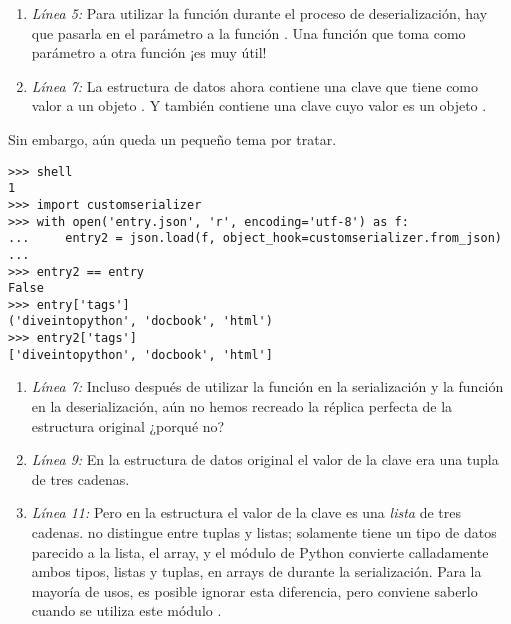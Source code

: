 \begin{enumerate}

\item \emph{Línea 5:} Para utilizar la función  durante el proceso de deserialización, hay que pasarla en el parámetro  a la función . Una función que toma como parámetro a otra función ¡es muy útil!

\item \emph{Línea 7:} La estructura de datos  ahora contiene una clave  que tiene como valor a un objeto . Y también contiene una clave  cuyo valor es un objeto .

\end{enumerate}

Sin embargo, aún queda un pequeño tema por tratar.

\noindent\begin{minipage}{\textwidth}
\begin{lstlisting}[mathescape=True]
>>> shell
1
>>> import customserializer
>>> with open('entry.json', 'r', encoding='utf-8') as f:
...     entry2 = json.load(f, object_hook=customserializer.from_json)
... 
>>> entry2 == entry
False
>>> entry['tags']  
('diveintopython', 'docbook', 'html')
>>> entry2['tags']
['diveintopython', 'docbook', 'html']
\end{lstlisting}
\end{minipage}

\begin{enumerate}

\item \emph{Línea 7:} Incluso después de utilizar la función  en la serialización y la función  en la deserialización, aún no hemos recreado la réplica perfecta de la estructura original ¿porqué no?

\item \emph{Línea 9:} En la estructura de datos original el valor de la clave  era una tupla de tres cadenas.

\item \emph{Línea 11:} Pero en la estructura  el valor de la clave  es una \emph{lista} de tres cadenas.  no distingue entre tuplas y listas; solamente tiene un tipo de datos parecido a la lista, el array, y el módulo  de Python convierte calladamente ambos tipos, listas y tuplas, en arrays de  durante la serialización. Para la mayoría de usos, es posible ignorar esta diferencia, pero conviene saberlo cuando se utiliza este módulo .

\end{enumerate}


